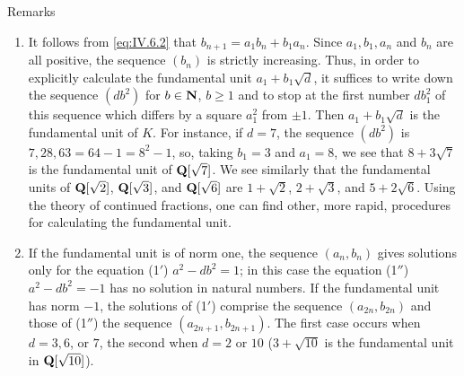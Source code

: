 \begin{statement}{Remarks}
\upshape
\begin{enumerate}[label=(\arabic*),leftmargin=2.0em,itemsep=0.1ex,topsep=0.3ex]
\item It follows from \eqref{eq:IV.6.2} that
$b_{n+1}=a_{1}b_{n}+b_{1}a_{n}$. Since $a_{1},b_{1},a_{n}$ and $b_{n}$ are
all positive, the sequence $(b_{n})$ is strictly increasing. Thus, in order
to explicitly calculate the fundamental unit $a_{1}+b_{1}\sqrt{d}$, it
suffices to write down the sequence $(db^{2})$ for $b\in\mathbf{N}$, $b\geq1$ and to
stop at the first number $db_{1}^{2}$ of this sequence which differs by a
square $a_{1}^{2}$ from $\pm1$. Then $a_{1}+b_{1}\sqrt{d}$ is the
fundamental unit of $K$. For instance, if $d=7$, the sequence $(db^{2})$ is
$7,28,63=64-1=8^{2}-1$, so, taking $b_{1}=3$ and $a_{1}=8$, we see that
$8+3\sqrt{7}$ is the fundamental unit of $\mathbf{Q}[\sqrt{7}]$. We see similarly
that the fundamental units of $\mathbf{Q}[\sqrt{2}]$, $\mathbf{Q}[\sqrt{3}]$, and
$\mathbf{Q}[\sqrt{6}]$ are $1+\sqrt{2}$, $2+\sqrt{3}$, and $5+2\sqrt{6}$. Using the
theory of continued fractions, one can find other, more rapid, procedures
for calculating the fundamental unit.
\item If the fundamental unit is of norm one, the sequence $(a_{n},b_{n})$
gives solutions only for the equation (1$'$) $a^{2}-db^{2}=1$; in this case
the equation (1$''$) $a^{2}-db^{2}=-1$ has no solution in natural numbers.
If the fundamental unit has norm $-1$, the solutions of (1$'$) comprise the
sequence $(a_{2n},b_{2n})$ and those of (1$''$) the sequence
$(a_{2n+1},b_{2n+1})$. The first case occurs when $d=3,6$, or $7$, the
second when $d=2$ or $10$ ($3+\sqrt{10}$ is the fundamental unit in
$\mathbf{Q}[\sqrt{10}]$).
\end{enumerate}
\end{statement}

